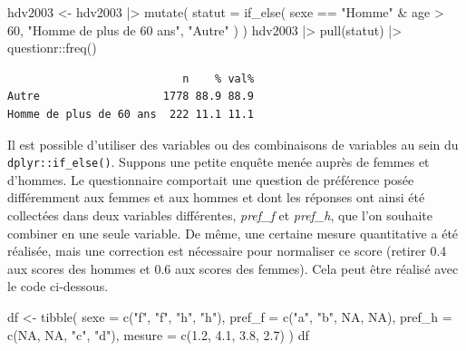 \documentclass[
  letterpaper,
  DIV=11,
  numbers=noendperiod,
  oneside]{scrreprt}
\newenvironment{Shaded}{\begin{snugshade}}{\end{snugshade}}
\newcommand{\AttributeTok}[1]{\textcolor[rgb]{0.40,0.45,0.13}{#1}}
\newcommand{\ConstantTok}[1]{\textcolor[rgb]{0.56,0.35,0.01}{#1}}
\newcommand{\DecValTok}[1]{\textcolor[rgb]{0.68,0.00,0.00}{#1}}
\newcommand{\FloatTok}[1]{\textcolor[rgb]{0.68,0.00,0.00}{#1}}
\newcommand{\FunctionTok}[1]{\textcolor[rgb]{0.28,0.35,0.67}{#1}}
\newcommand{\NormalTok}[1]{\textcolor[rgb]{0.00,0.23,0.31}{#1}}
\newcommand{\OtherTok}[1]{\textcolor[rgb]{0.00,0.23,0.31}{#1}}
\newcommand{\SpecialCharTok}[1]{\textcolor[rgb]{0.37,0.37,0.37}{#1}}
\newcommand{\StringTok}[1]{\textcolor[rgb]{0.13,0.47,0.30}{#1}}
\begin{document}
\begin{Shaded}
\begin{Highlighting}[]
\NormalTok{hdv2003 }\OtherTok{\textless{}{-}} 
\NormalTok{  hdv2003 }\SpecialCharTok{|\textgreater{}} 
  \FunctionTok{mutate}\NormalTok{(}
    \AttributeTok{statut =} \FunctionTok{if\_else}\NormalTok{(}
\NormalTok{      sexe }\SpecialCharTok{==} \StringTok{"Homme"} \SpecialCharTok{\&}\NormalTok{ age }\SpecialCharTok{\textgreater{}} \DecValTok{60}\NormalTok{,}
      \StringTok{"Homme de plus de 60 ans"}\NormalTok{,}
      \StringTok{"Autre"}
\NormalTok{    )}
\NormalTok{  )}
\NormalTok{hdv2003 }\SpecialCharTok{|\textgreater{}} 
  \FunctionTok{pull}\NormalTok{(statut) }\SpecialCharTok{|\textgreater{}} 
\NormalTok{  questionr}\SpecialCharTok{::}\FunctionTok{freq}\NormalTok{()}
\end{Highlighting}
\end{Shaded}

\begin{verbatim}
                           n    % val%
Autre                   1778 88.9 88.9
Homme de plus de 60 ans  222 11.1 11.1
\end{verbatim}

Il est possible d'utiliser des variables ou des combinaisons de
variables au sein du \texttt{dplyr::if\_else()}. Suppons une petite
enquête menée auprès de femmes et d'hommes. Le questionnaire comportait
une question de préférence posée différemment aux femmes et aux hommes
et dont les réponses ont ainsi été collectées dans deux variables
différentes, \emph{pref\_f} et \emph{pref\_h}, que l'on souhaite
combiner en une seule variable. De même, une certaine mesure
quantitative a été réalisée, mais une correction est nécessaire pour
normaliser ce score (retirer 0.4 aux scores des hommes et 0.6 aux scores
des femmes). Cela peut être réalisé avec le code ci-dessous.

\begin{Shaded}
\begin{Highlighting}[]
\NormalTok{df }\OtherTok{\textless{}{-}} \FunctionTok{tibble}\NormalTok{(}
  \AttributeTok{sexe =} \FunctionTok{c}\NormalTok{(}\StringTok{"f"}\NormalTok{, }\StringTok{"f"}\NormalTok{, }\StringTok{"h"}\NormalTok{, }\StringTok{"h"}\NormalTok{),}
  \AttributeTok{pref\_f =} \FunctionTok{c}\NormalTok{(}\StringTok{"a"}\NormalTok{, }\StringTok{"b"}\NormalTok{, }\ConstantTok{NA}\NormalTok{, }\ConstantTok{NA}\NormalTok{),}
  \AttributeTok{pref\_h =} \FunctionTok{c}\NormalTok{(}\ConstantTok{NA}\NormalTok{, }\ConstantTok{NA}\NormalTok{, }\StringTok{"c"}\NormalTok{, }\StringTok{"d"}\NormalTok{),}
  \AttributeTok{mesure =} \FunctionTok{c}\NormalTok{(}\FloatTok{1.2}\NormalTok{, }\FloatTok{4.1}\NormalTok{, }\FloatTok{3.8}\NormalTok{, }\FloatTok{2.7}\NormalTok{)}
\NormalTok{)}
\NormalTok{df}
\end{Highlighting}
\end{Shaded}
\end{document}
